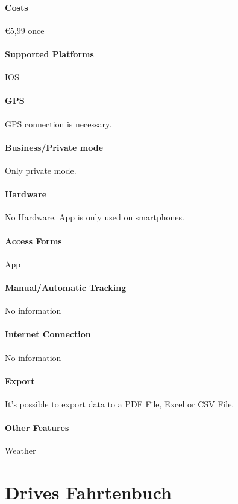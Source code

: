 \paragraph{Costs} \euro 5,99 once
\paragraph{Supported Platforms} IOS
\paragraph{GPS} GPS connection is necessary.
\paragraph{Business/Private mode} Only private mode.
\paragraph{Hardware} No Hardware. App is only used on smartphones.
\paragraph{Access Forms} App
\paragraph{Manual/Automatic Tracking} No information
\paragraph{Internet Connection} No information
\paragraph{Export} It’s possible to export data to a PDF File, Excel or CSV File.
\paragraph{Other Features} Weather
\newpage

\section{Drives Fahrtenbuch}
